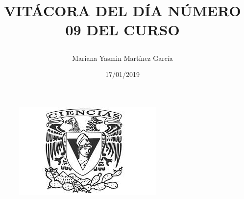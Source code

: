 \documentclass{article}
\title{\Huge\item\color{blue}\textbf{VITÁCORA DEL DÍA NÚMERO 09 DEL CURSO}}
\author{\Large Mariana Yasmin Martínez García}
\date{\Large 17/01/2019}
\begin{document}
\begin{figure}[t]
	\centering
	\includegraphics[width=0.7\linewidth]{Imagenes/1}
	\caption{}
	\label{1}
\end{figure}

	\maketitle
		
	\newpage
	
\end{document}
